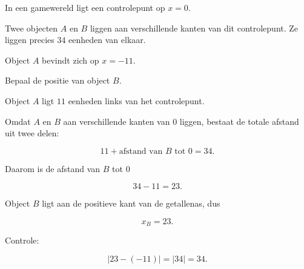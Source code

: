 \documentclass{ximera}
\begin{document}
    
    \begin{oefening}{\oefG}
    
    In een gamewereld ligt een controlepunt op \(x=0\).
    
    Twee objecten \(A\) en \(B\) liggen aan verschillende kanten van dit
    controlepunt. Ze liggen precies \(34\) eenheden van elkaar.
    
    Object \(A\) bevindt zich op \(x=-11\).
    
    \begin{question}
    
    Bepaal de positie van object \(B\).
    
    \begin{oplossing}
    
    Object \(A\) ligt \(11\) eenheden links van het controlepunt.
    
    Omdat \(A\) en \(B\) aan verschillende kanten van \(0\) liggen, bestaat
    de totale afstand uit twee delen:
    
    \[
    11+\text{afstand van }B\text{ tot }0=34.
    \]
    
    Daarom is de afstand van \(B\) tot \(0\)
    
    \[
    34-11=23.
    \]
    
    Object \(B\) ligt aan de positieve kant van de getallenas, dus
    
    \[
    x_B=23.
    \]
    
    Controle:
    
    \[
    |23-(-11)|=|34|=34.
    \]
    
    \end{oplossing}
    
    \end{question}
    
    \end{oefening}
    
\end{document}
